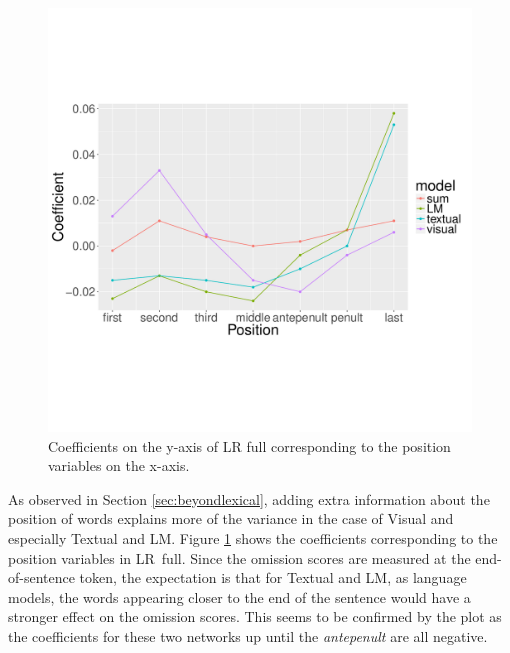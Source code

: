\begin{figure}
\centering
 \includegraphics[scale=0.4]{position-coef.pdf}
 \caption{Coefficients on the y-axis of {\sc LR full} corresponding to the
position variables on the x-axis.}
 \label{fig:posrqs}
\end{figure}
 
As observed in Section \ref{sec:beyondlexical}, 
adding extra information about the position of words 
explains more of the variance in the case of {\sc Visual} and especially
{\sc Textual} and {\sc LM}.
Figure \ref{fig:posrqs} shows the coefficients corresponding to the
position variables in {\sc LR~full}. Since the omission scores 
are measured at the end-of-sentence token, the expectation is that 
for {\sc Textual} and {\sc LM}, as language models,  
the words appearing closer to the end of the sentence would have a
stronger effect on the omission scores. This seems to be confirmed by
the plot as the coefficients for these two networks up until the
\emph{antepenult} are all negative. 


